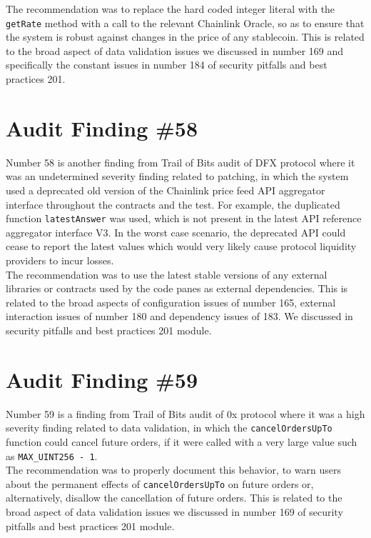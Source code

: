 The recommendation was to replace the hard coded integer literal with the \verb|getRate| method with a call to the relevant Chainlink Oracle, so as to ensure that the system is robust against changes in the price of any stablecoin. This is related to the broad aspect of data validation issues we discussed in number 169 and specifically the constant issues in number 184 of security pitfalls and best practices 201.

\section{Audit Finding \#58}

Number 58 is another finding from Trail of Bits audit of DFX protocol where it was an undetermined severity finding related to patching, in which the system used a deprecated old version of the Chainlink price feed API aggregator interface throughout the contracts and the test. For example, the duplicated function \verb|latestAnswer| was used, which is not present in the latest API reference aggregator interface V3. In the worst case scenario, the deprecated API could cease to report the latest values which would very likely cause protocol liquidity providers to incur losses.\\

The recommendation was to use the latest stable versions of any external libraries or contracts used by the code panes as external dependencies. This is related to the broad aspects of configuration issues of number 165, external interaction issues of number 180 and dependency issues of 183. We discussed in security pitfalls and best practices 201 module.

\section{Audit Finding \#59}

Number 59 is a finding from Trail of Bits audit of 0x protocol where it was a high severity finding related to data validation, in which the \verb|cancelOrdersUpTo| function could cancel future orders, if it were called with a very large value such as  \verb|MAX_UINT256 - 1|.\\

The recommendation was to properly document this behavior, to warn users about the permanent effects of \verb|cancelOrdersUpTo| on future orders or, alternatively, disallow the cancellation of future orders. This is related to the broad aspect of data validation issues we discussed in number 169 of security pitfalls and best practices 201 module.

